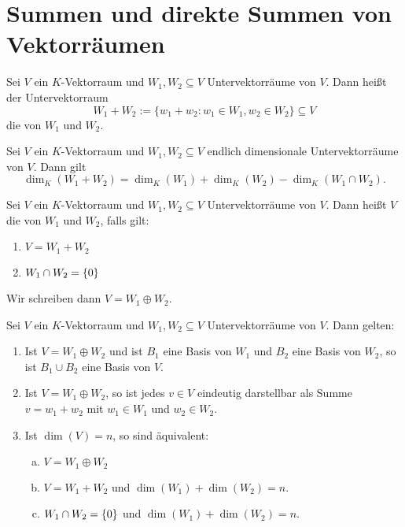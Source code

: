 \section{Summen und direkte Summen von Vektorräumen}

\begin{definition}
	\label{def:I.12.1}
	Sei $V$ ein $K$-Vektorraum und $W_1,W_2 \subseteq V$ Untervektorräume von $V$.
	Dann heißt der Untervektorraum
	\[
		W_1 + W_2 := \{w_1 + w_2 : w_1 \in W_1, w_2 \in W_2\} \subseteq V
	\]
	die  von $W_1$ und $W_2$.
\end{definition}

\begin{satz}
	\label{satz:I.12.2}
	Sei $V$ ein $K$-Vektorraum und $W_1,W_2 \subseteq V$ endlich dimensionale Untervektorräume von $V$.
	Dann gilt
	\[
		\dim_K(W_1+W_2) = \dim_K(W_1) + \dim_K(W_2) - \dim_K(W_1 \cap W_2).
	\]
\end{satz}

\begin{definition}
	\label{def:I.12.3}
	Sei $V$ ein $K$-Vektorraum und $W_1,W_2 \subseteq V$ Untervektorräume von $V$.
	Dann heißt $V$ die  von $W_1$ und $W_2$, falls gilt:
	\begin{enumerate}[(1)]
		\item	$V = W_1 + W_2$
		\item	$W_1 \cap W_2 = \{0\}$
	\end{enumerate}
	Wir schreiben dann $V = W_1 \oplus W_2$.
\end{definition}

\begin{satz}
	\label{satz:I.12.4}
	Sei $V$ ein $K$-Vektorraum und $W_1,W_2 \subseteq V$ Untervektorräume von $V$.
	Dann gelten:
	\begin{enumerate}[(1)]
		\item Ist $V = W_1 \oplus W_2$ und ist $B_1$ eine Basis von $W_1$ und $B_2$ eine Basis von  $W_2$, so ist $B_1 \cup B_2$ eine Basis von $V$.
		\item Ist $V = W_1 \oplus W_2$, so ist jedes $v \in V$ eindeutig darstellbar als Summe $v = w_1 + w_2$ mit $w_1 \in W_1$ und $w_2 \in W_2$.
		\item Ist $\dim(V) = n$, so sind äquivalent:
		\begin{enumerate}[a)]
			\item $V = W_1 \oplus W_2$
			\item $V = W_1 + W_2$ und $\dim(W_1) + \dim(W_2) = n$.
			\item $W_1 \cap W_2 = \{0\}$ und $\dim(W_1) + \dim(W_2) = n$.
		\end{enumerate}
	\end{enumerate}
\end{satz}

